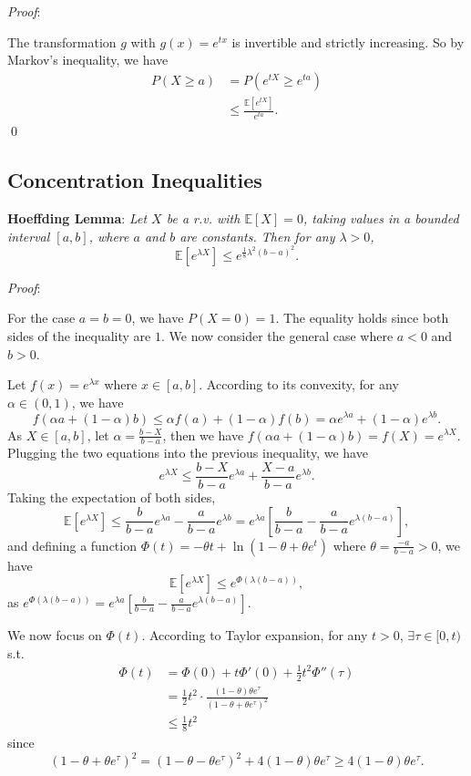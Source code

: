 \documentclass{progartcn}
\begin{document}
		\textit{Proof}:

		The transformation $g$ with $g(x)=e^{tx}$ is invertible and strictly increasing. So by Markov's inequality, we have
		\[\begin{split}
		P(X\ge a)&=P(e^{tX}\ge e^{ta})\\
		&\le \frac{\mathbb{E}[e^{tX}]}{e^{ta}}.
		\end{split}
		\]
		\qed

	\subsection{Concentration Inequalities}

		\textbf{Hoeffding Lemma}: \textit{Let $X$ be a r.v. with $\mathbb{E}[X]=0$, taking values in a bounded interval $[a, b]$, where $a$ and $b$ are constants. Then for any $\lambda>0$,}
		\[\mathbb{E}[e^{\lambda X}]\le e^{\frac{1}{8} \lambda^2(b-a)^2}.\]

		\textit{Proof}:

		For the case $a=b=0$, we have $P(X=0)=1$. The equality holds since both sides of the inequality are $1$. We now consider the general case where $a<0$ and $b>0$.

		Let $f(x)=e^{\lambda x}$ where $x\in [a,b]$. According to its convexity, for any $\alpha\in (0,1)$, we have
		\[f(\alpha a +(1-\alpha)b)\le \alpha f(a)+(1-\alpha)f(b)=\alpha e^{\lambda a}+(1-\alpha)e^{\lambda b}.\]
		As $X\in [a,b]$, let $\alpha = \frac{b-X}{b-a}$, then we have $f(\alpha a+(1-\alpha)b)=f(X)=e^{\lambda X}$. Plugging the two equations into the previous inequality, we have
		\[e^{\lambda X}\le \frac{b-X}{b-a}e^{\lambda a}+\frac{X-a}{b-a}e^{\lambda b}.
		\]
		Taking the expectation of both sides,
		\[\mathbb{E}[e^{\lambda X}]\le \frac{b}{b-a}e^{\lambda a}-\frac{a}{b-a}e^{\lambda b}=e^{\lambda a}\left[\frac{b}{b-a}-\frac{a}{b-a}e^{\lambda(b-a)}\right],\]
		and defining a function $\Phi(t)=-\theta t +\ln (1-\theta+\theta e^t)$ where $\theta=\frac{-a}{b-a} >0$, we have
		\[\mathbb{E}[e^{\lambda X}]\le e^{\Phi(\lambda(b-a))},\]
		as $e^{\Phi(\lambda(b-a))}=e^{\lambda a}\left[\frac{b}{b-a}-\frac{a}{b-a}e^{\lambda(b-a)}\right].$

		We now focus on $\Phi(t)$. According to Taylor expansion, for any $t>0$, $\exists \tau\in[0,t)$ s.t.
		\[\begin{split}
		\Phi(t)&=\Phi(0)+t\Phi'(0)+\frac{1}{2}t^2\Phi''(\tau)\\
		&=\frac{1}{2} t^2\cdot \frac{(1-\theta)\theta e^\tau}{(1-\theta+\theta e^\tau)^2}\\
		&\le \frac{1}{8}t^2
		\end{split}
		\]
		since
		\[(1-\theta+\theta e^\tau)^2=(1-\theta-\theta e^\tau)^2+4(1-\theta)\theta e^\tau\ge 4(1-\theta)\theta e^\tau.\]
\end{document}
